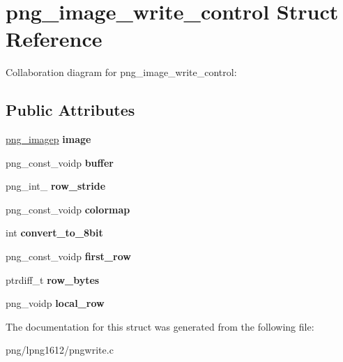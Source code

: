 \hypertarget{structpng__image__write__control}{\section{png\+\_\+image\+\_\+write\+\_\+control Struct Reference}
\label{structpng__image__write__control}
}


Collaboration diagram for png\+\_\+image\+\_\+write\+\_\+control\+:
\subsection*{Public Attributes}
\begin{DoxyCompactItemize}
\item 
\hypertarget{structpng__image__write__control_a5187b99ed3fd962d802e0e9c3a61f4ee}{\hyperlink{structpng__image}{png\+\_\+imagep} {\bfseries image}}\label{structpng__image__write__control_a5187b99ed3fd962d802e0e9c3a61f4ee}

\item 
\hypertarget{structpng__image__write__control_a11f225e24d735bda426ca5319d4c848f}{png\+\_\+const\+\_\+voidp {\bfseries buffer}}\label{structpng__image__write__control_a11f225e24d735bda426ca5319d4c848f}

\item 
\hypertarget{structpng__image__write__control_aa7da32d072dbaf2d06bf4eea1a800114}{png\+\_\+int\+\_ {\bfseries row\+\_\+stride}}\label{structpng__image__write__control_aa7da32d072dbaf2d06bf4eea1a800114}

\item 
\hypertarget{structpng__image__write__control_a7e73acce8ac1c4fc12fe2721f7e0ae1f}{png\+\_\+const\+\_\+voidp {\bfseries colormap}}\label{structpng__image__write__control_a7e73acce8ac1c4fc12fe2721f7e0ae1f}

\item 
\hypertarget{structpng__image__write__control_a22d216c23ede3b5553ab4002b89d1341}{int {\bfseries convert\+\_\+to\+\_\+8bit}}\label{structpng__image__write__control_a22d216c23ede3b5553ab4002b89d1341}

\item 
\hypertarget{structpng__image__write__control_abc5f08f4e87157c3deac31eac974814b}{png\+\_\+const\+\_\+voidp {\bfseries first\+\_\+row}}\label{structpng__image__write__control_abc5f08f4e87157c3deac31eac974814b}

\item 
\hypertarget{structpng__image__write__control_ad5026b060a45346d968b08b76d40b66c}{ptrdiff\+\_\+t {\bfseries row\+\_\+bytes}}\label{structpng__image__write__control_ad5026b060a45346d968b08b76d40b66c}

\item 
\hypertarget{structpng__image__write__control_a5942b04084bbf48607b6ae67fef7195d}{png\+\_\+voidp {\bfseries local\+\_\+row}}\label{structpng__image__write__control_a5942b04084bbf48607b6ae67fef7195d}

\end{DoxyCompactItemize}


The documentation for this struct was generated from the following file\+:\begin{DoxyCompactItemize}
\item 
png/lpng1612/pngwrite.\+c\end{DoxyCompactItemize}

